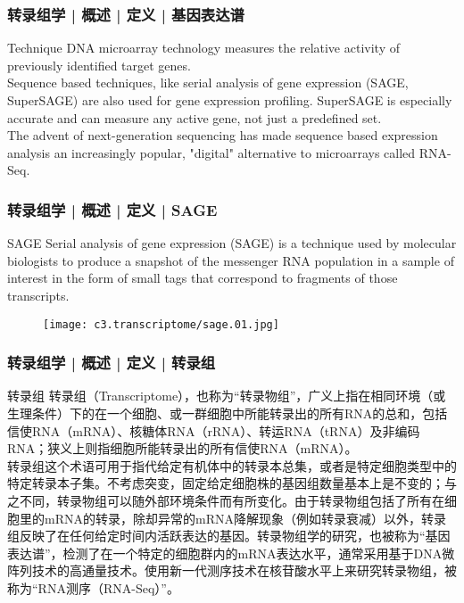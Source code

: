 \begin{frame}
  \frametitle{转录组学 | 概述 | 定义 | 基因表达谱}
  \begin{block}{Technique}
    DNA microarray technology measures the relative activity of previously identified target genes.\\
    \vspace{1em}
 Sequence based techniques, like serial analysis of gene expression (SAGE, SuperSAGE) are also used for gene expression profiling. SuperSAGE is especially accurate and can measure any active gene, not just a predefined set.\\
 \vspace{1em}
 The advent of next-generation sequencing has made sequence based expression analysis an increasingly popular, "digital" alternative to microarrays called RNA-Seq. 
  \end{block}
\end{frame}

\begin{frame}
  \frametitle{转录组学 | 概述 | 定义 | SAGE}
  \begin{block}{SAGE}
    Serial analysis of gene expression (SAGE) is a technique used by molecular biologists to produce a snapshot of the messenger RNA population in a sample of interest in the form of small tags that correspond to fragments of those transcripts.
  \end{block}
  \begin{figure}
    \centering
    \texttt{[image: c3.transcriptome/sage.01.jpg]}
  \end{figure}
\end{frame}

\begin{frame}
  \frametitle{转录组学 | 概述 | 定义 | 转录组}
  \begin{block}{转录组}
转录组（Transcriptome），也称为“转录物组”，广义上指在相同环境（或生理条件）下的在一个细胞、或一群细胞中所能转录出的所有RNA的总和，包括信使RNA（mRNA）、核糖体RNA（rRNA）、转运RNA（tRNA）及非编码RNA；狭义上则指细胞所能转录出的所有信使RNA（mRNA）。\\
\vspace{1em}
转录组这个术语可用于指代给定有机体中的转录本总集，或者是特定细胞类型中的特定转录本子集。不考虑突变，固定给定细胞株的基因组数量基本上是不变的；与之不同，转录物组可以随外部环境条件而有所变化。由于转录物组包括了所有在细胞里的mRNA的转录，除却异常的mRNA降解现象（例如转录衰减）以外，转录组反映了在任何给定时间内活跃表达的基因。转录物组学的研究，也被称为“基因表达谱”，检测了在一个特定的细胞群内的mRNA表达水平，通常采用基于DNA微阵列技术的高通量技术。使用新一代测序技术在核苷酸水平上来研究转录物组，被称为“RNA测序（RNA-Seq）”。
  \end{block}
\end{frame}

